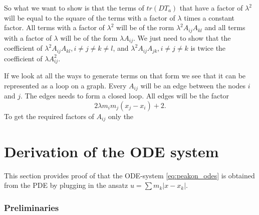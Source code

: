 \documentclass[english,master]{liumaiex}
\theoremstyle{plain}
\theoremstyle{definition}
\begin{document}
So what we want to show is that the terms of $tr(D T_a)$ that have a factor of $\lambda^2$ will be equal to the square of the terms with a factor of $\lambda$ times a constant factor. All terms with a factor of $\lambda^2$ will be of the rorm $\lambda^2 A_{ij} A_{kl}$ and all terms with a factor of $\lambda$ will be of the form $\lambda A_{ij}$. We just need to show that the coefficient of $\lambda^2 A_{ij} A_{kl}, i \neq j \neq k \neq l$, and $\lambda^2 A_{ij} A_{jk}, i \neq j \neq k$ is twice the coefficient of $\lambda A_{ij}^2$.


If we look at all the ways to generate terms on that form we see that it can be represented as a loop on a graph. Every $A_{ij}$ will be an edge between the nodes $i$ and $j$. The edges needs to form a closed loop. All edges will be the factor
\begin{equation}
	2\lambda m_i m_j (x_j - x_i) + 2.
\end{equation}
To get the required factors of $A_{ij}$ only the 

%
%
\newpage
\appendix

\section{Derivation of the ODE system} \label{sec:DerivationODE}

This section provides proof of that the ODE-system \eqref{eq:peakon_odes} is obtained from the PDE by plugging in the ansatz $u = \sum m_k |x - x_k|$.

\subsubsection*{Preliminaries}
\end{document}
